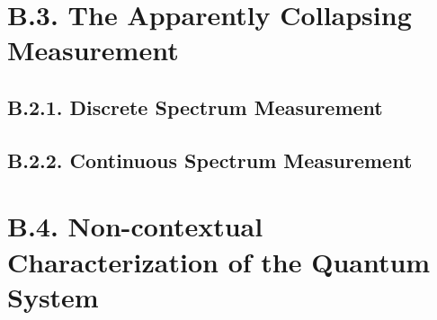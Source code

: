 \documentclass[11pt, a4paper]{article} %
\begin{document}

\section*{B.3. The Apparently Collapsing Measurement}

\subsection*{B.2.1. Discrete Spectrum Measurement}
\subsection*{B.2.2. Continuous Spectrum Measurement}

\section*{B.4. Non-contextual Characterization of the Quantum System}

\end{document}
